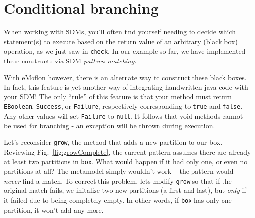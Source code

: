 \newpage
\hypertarget{sec:conBran}{}
\section{Conditional branching}
\genHeader

When working with SDMs, you'll often find yourself needing to decide which statement(s) to execute based on the return value of an arbitrary (black box)
operation, as we just saw in \texttt{check}. In our example so far, we have implemented these constructs via SDM \emph{pattern matching}. 

With eMoflon however, there is an alternate way to construct these black boxes. In fact, this feature is yet another way of integrating handwritten java code
with your SDM! The only ``rule'' of this feature is that your method must return \texttt{EBoolean}, \texttt{Success}, or \texttt{Failure}, respectively
corresponding to \texttt{true} and \texttt{false}. Any other values will set \texttt{Failure} to \texttt{null}. It follows that void methods cannot be used for
branching - an exception will be thrown during execution.

Let's reconsider \texttt{grow}, the method that adds a new partition to our box. Reviewing Fig.~\ref{fig:growComplete}, the current pattern assumes
there are already at least two partitions in \texttt{box}. What would happen if it had only one, or even no partitions at all? The metamodel simply wouldn't
work -- the pattern would \emph{never} find a match. To correct this problem, lets modify \texttt{grow} so that if the original match fails, we
initalize two new partitions (a first and last), but \emph{only} if it failed due to being completely empty. In other words, if \texttt{box} has only one
partition, it won't add any more.





